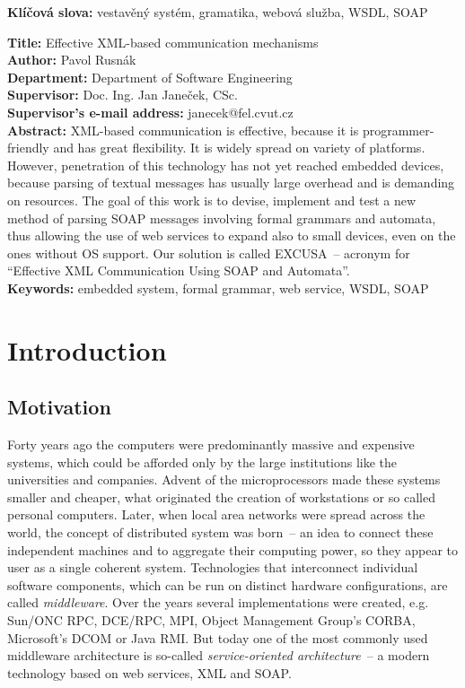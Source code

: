 \documentclass[12pt,notitlepage]{report}
\begin{document}
\noindent \textbf{Klíčová slova:} vestavěný systém, gramatika, webová služba, WSDL, SOAP

\noindent
\textbf{Title:} Effective XML-based communication mechanisms\\
\textbf{Author:} Pavol Rusnák\\
\textbf{Department:} Department of Software Engineering\\
\textbf{Supervisor:} Doc. Ing. Jan Janeček, CSc.\\
\textbf{Supervisor's e-mail address:} janecek@fel.cvut.cz\\

\noindent \textbf{Abstract:}
XML-based communication is effective, because it is programmer-friendly and has great flexibility. It is widely spread on variety of platforms. However, penetration of this technology has not yet reached embedded devices, because parsing of textual messages has usually large overhead and is demanding on resources. The goal of this work is to devise, implement and test a new method of parsing SOAP messages involving formal grammars and automata, thus allowing the use of web services to expand also to small devices, even on the ones without OS support. Our solution is called EXCUSA~--  acronym for ``Effective XML Communication Using SOAP and Automata''.\\

\noindent \textbf{Keywords:} embedded system, formal grammar, web service, WSDL, SOAP

\newpage


\chapter{Introduction}

\section{Motivation}
Forty years ago the computers were predominantly massive and expensive systems, which could be afforded only by the large institutions like the universities and companies. Advent of the microprocessors made these systems smaller and cheaper, what originated the creation of workstations or so called personal computers. Later, when local area networks were spread across the world, the concept of distributed system was born~-- an idea to connect these independent machines and to aggregate their computing power, so they appear to user as a single coherent system. Technologies that interconnect individual software components, which can be run on distinct hardware configurations, are called \textit{middleware}. Over the years several implementations were created, e.g. Sun/ONC RPC, DCE/RPC, MPI, Object Management Group's CORBA, Microsoft's DCOM or Java RMI. But today one of the most commonly used middleware architecture is so-called \textit{service-oriented architecture}~-- a modern technology based on web services, XML and SOAP.
\end{document}
